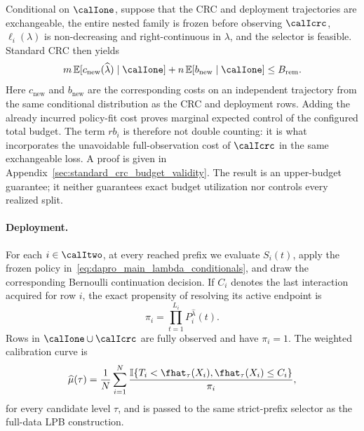 Conditional on $\calIone$, suppose that the CRC and deployment trajectories
are exchangeable, the entire nested family is frozen before observing
$\calIcrc$, $\ell_i(\lambda)$ is non-decreasing and right-continuous in
$\lambda$, and the selector is feasible.  Standard CRC then yields
\begin{equation}
    m\,\mathbb E[c_{\mathrm{new}}(\widehat\lambda)\mid\calIone]
    +n\,\mathbb E[b_{\mathrm{new}}\mid\calIone]
    \leq B_{\mathrm{rem}}.
    \label{eq:dapro_main_budget_guarantee}
\end{equation}
Here $c_{\mathrm{new}}$ and $b_{\mathrm{new}}$ are the corresponding costs
on an independent trajectory from the same conditional distribution as the
CRC and deployment rows.
Adding the already incurred policy-fit cost proves marginal expected control
of the configured total budget.  The term $r b_i$ is therefore not double
counting: it is what incorporates the unavoidable full-observation cost of
$\calIcrc$ in the same exchangeable loss.  A proof is given in
Appendix~\ref{sec:standard_crc_budget_validity}.  The result is an upper-budget
guarantee; it neither guarantees exact budget utilization nor controls every
realized split.

\paragraph{Deployment.}
For each $i\in\calItwo$, at every reached prefix we evaluate $S_i(t)$, apply
the frozen policy in~\eqref{eq:dapro_main_lambda_conditionals}, and draw the
corresponding Bernoulli continuation decision.  If $C_i$ denotes the last
interaction acquired for row $i$, the exact propensity of resolving its
active endpoint is
\begin{equation}
    \pi_i=\prod_{t=1}^{L_i}P_i^{\widehat\lambda}(t).
    \label{eq:dapro_main_logged_propensity}
\end{equation}
Rows in $\calIone\cup\calIcrc$ are fully observed and have $\pi_i=1$.
The weighted calibration curve is
\begin{equation}
    \widehat\mu(\tau)
    =\frac{1}{N}\sum_{i=1}^{N}
      \frac{
        \mathbb I\{T_i<\fhat_\tau(X_i),
                    \fhat_\tau(X_i)\leq C_i\}
      }{\pi_i},
    \label{eq:dapro_main_ht_curve}
\end{equation}
for every candidate level $\tau$, and is passed to the same strict-prefix
selector as the full-data LPB construction.
